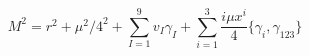 \begin{equation}\label{Mfformula}
M^2=r^2+\mu^2/4^2+\sum_{I=1}^9 v_I \gamma_I + \sum_{i=1}^3\frac{i\mu
x^i}{4} \{\gamma_i, \gamma_{123}\}
\end{equation}

